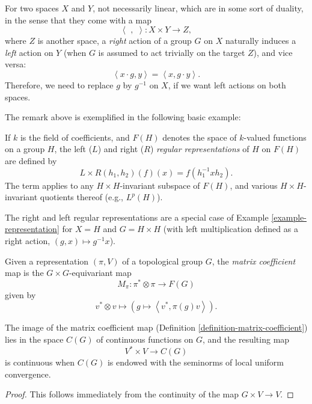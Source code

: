 \begin{remark}
\label{remark-spaces-induality}
 For two spaces $X$ and $Y$, not necessarily linear, which are in some sort of duality, in the sense that they come with a map 
 $$\left< \,\, , \,\, \right> : X\times Y\to Z,$$ 
 where $Z$ is another space, a \emph{right} action of a group $G$ on $X$ naturally induces a \emph{left} action on $Y$ (when $G$ is assumed to act trivially on the target $Z$), and vice versa:
 $$  \left< x\cdot g, y \right> = \left< x, g\cdot y \right>.$$
 Therefore, we need to replace $g$ by $g^{-1}$ on $X$, if we want left actions on both spaces.
\end{remark}

The remark above is exemplified in the following basic example:

\begin{definition}
 \label{definition-regular-representation}
If $k$ is the field of coefficients, and $F(H)$ denotes the space of $k$-valued functions on a group $H$, the left ($L$) and right ($R$) {\it regular representations} of $H$ on $F(H)$ are defined by 
$$ L \times R (h_1, h_2) (f) (x) = f(h_1^{-1} x h_2).$$
The term applies to any $H\times H$-invariant subspace of $F(H)$, and various $H\times H$-invariant quotients thereof (e.g., $L^p(H)$). 
\end{definition}

The right and left regular representations are a special case of Example \ref{example-representation} for $X=H$ and $G=H\times H$ (with left multiplication defined as a right action, $(g,x)\mapsto g^{-1}x$).

\begin{definition}
\label{definition-matrix-coefficient}
Given a representation $(\pi, V)$ of a topological group $G$, the {\it matrix coefficient} map is the $G\times G$-equivariant map 
$$M_\pi: \pi^* \otimes \pi \to F(G)$$
given by 
$$ v^*\otimes v \mapsto \left(g \mapsto \left< v^*, \pi(g) v\right> \right).$$
\end{definition}

\begin{lemma}
\label{lemma-matrixcoefficient-continuous}
The image of the matrix coefficient map (Definition \ref{definition-matrix-coefficient}) lies in the space $C(G)$ of continuous functions on $G$, and the resulting map 
$$ V^* \times V \to C(G)$$
is continuous when $C(G)$ is endowed with the seminorms of local uniform convergence.
\end{lemma}

\begin{proof}
 This follows immediately from the continuity of the map $G\times V\to V$.
\end{proof}


